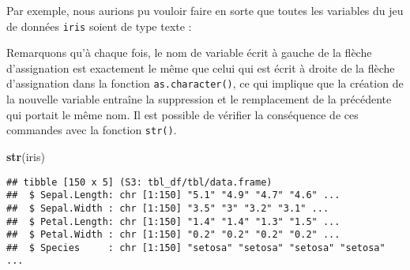 \documentclass[
  french,
]{book}
\newenvironment{Shaded}{\begin{snugshade}}{\end{snugshade}}
\newcommand{\DataTypeTok}[1]{\textcolor[rgb]{0.13,0.29,0.53}{#1}}
\newcommand{\KeywordTok}[1]{\textcolor[rgb]{0.13,0.29,0.53}{\textbf{#1}}}
\newcommand{\NormalTok}[1]{#1}
\newcommand{\OperatorTok}[1]{\textcolor[rgb]{0.81,0.36,0.00}{\textbf{#1}}}
\newcommand{\StringTok}[1]{\textcolor[rgb]{0.31,0.60,0.02}{#1}}
\begin{document}
Par exemple, nous aurions pu vouloir faire en sorte que toutes les variables du jeu de données \texttt{iris} soient de type texte :

\begin{Shaded}
\end{Shaded}

Remarquons qu'à chaque fois, le nom de variable écrit à gauche de la flèche d'assignation est exactement le même que celui qui est écrit à droite de la flèche d'assignation dans la fonction \texttt{as.character()}, ce qui implique que la création de la nouvelle variable entraîne la suppression et le remplacement de la précédente qui portait le même nom. Il est possible de vérifier la conséquence de ces commandes avec la fonction \texttt{str()}.

\begin{Shaded}
\begin{Highlighting}[]
\KeywordTok{str}\NormalTok{(iris)}
\end{Highlighting}
\end{Shaded}

\begin{verbatim}
## tibble [150 x 5] (S3: tbl_df/tbl/data.frame)
##  $ Sepal.Length: chr [1:150] "5.1" "4.9" "4.7" "4.6" ...
##  $ Sepal.Width : chr [1:150] "3.5" "3" "3.2" "3.1" ...
##  $ Petal.Length: chr [1:150] "1.4" "1.4" "1.3" "1.5" ...
##  $ Petal.Width : chr [1:150] "0.2" "0.2" "0.2" "0.2" ...
##  $ Species     : chr [1:150] "setosa" "setosa" "setosa" "setosa" ...
\end{verbatim}
\end{document}
